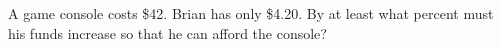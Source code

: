 A game console costs \$42. Brian has only \$4.20. By at least what percent must his funds increase so that he can afford the console?
